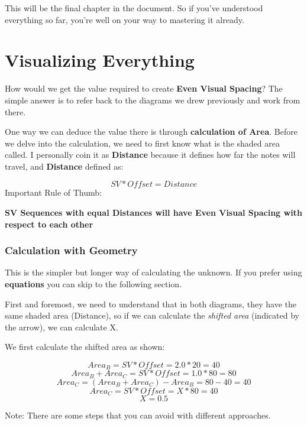 This will be the final chapter in the document. So if you've understood everything so far, you're well on your way to mastering it already.

\section{Visualizing Everything}



How would we get the value required to create \textbf{Even Visual Spacing}? The simple answer is to refer back to the diagrams we drew previously and work from there.


\newline
One way we can deduce the value there is through \textbf{calculation of Area}.
\newline
Before we delve into the calculation, we need to first know what is the shaded area called. I personally coin it as \textbf{Distance} because it defines how far the notes will travel, and \textbf{Distance} defined as:

\[ SV * Offset = Distance \]
Important Rule of Thumb: 
\begin{center}
   \textbf{SV Sequences with equal Distances will have Even Visual Spacing with respect to each other}
\end{center}
\newpage

\subsubsection{Calculation with Geometry}

This is the simpler but longer way of calculating the unknown. If you prefer using \textbf{equations} you can skip to the following section.

First and foremost, we need to understand that in both diagrams, they have the same shaded area (Distance), so if we can calculate the \textit{shifted area} (indicated by the arrow), we can calculate X.

We first calculate the shifted area as shown:

\[ Area_B = SV * Offset = 2.0 * 20 = 40 \]
\[ Area_B + Area_C = SV * Offset = 1.0 * 80 = 80 \]
\[ Area_C = (Area_B + Area_C) - Area_B = 80 - 40 = 40 \]
\[ Area_C = SV * Offset = X * 80 = 40 \]
\[ X = 0.5 \]

Note: There are some steps that you can avoid with different approaches.

